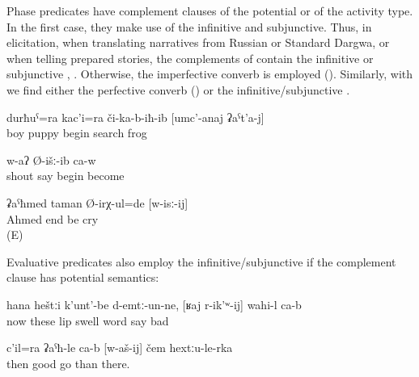 Phase predicates have complement clauses of the potential or of the activity type. In the first case, they make use of the infinitive and subjunctive. Thus, in elicitation, when translating narratives from Russian or Standard Dargwa, or when telling prepared stories, the complements of  contain the infinitive or subjunctive , . Otherwise, the imperfective converb is employed (). Similarly, with  we find either the perfective converb () or the infinitive/subjunctive .
%
\begin{exe}
	\ex	\label{ex:‎The boy and the frog began to search for the frog}
	\gll	durħuˁ=ra	kac'i=ra	či-ka-b-iħ-ib	[umc'-anaj	ʡaˁt'a-j]\\
		boy	puppy	begin	search	frog\\
	\glt	{}

	\ex	\label{ex:He began to shout}
	\gll	[waˁw	Ø-ik'ʷ-ij]	w-aʔ	Ø-išː-ib	ca-w\\
		shout	say	\tsc{m-}begin	become	\\
	\glt	{}

	\ex	\label{ex:Ahmed stopped crying}
	\gll	ʡaˁħmed taman Ø-irχ-ul=de	[w-isː-ij]\\
		Ahmed end	be	cry\\
	\glt	{} (E)
\end{exe}

Evaluative predicates also employ the infinitive\slash subjunctive if the complement clause has potential semantics:
%
\begin{exe}
	\ex	\label{ex:‎Now my lips are swollen, it is difficult to talk}
	\gll	hana	heštːi	k'unt'-be	d-emtː-un-ne,	[ʁaj	r-ik'ʷ-ij]	wahi-l	ca-b	\\
		now	these	lip	swell	word	say	bad	\\
	\glt	{}

	\ex	\label{ex:‎It is good (better) to go (on the ice-covered ground) than from there}
	\gll	c'il=ra	ʡaˁħ-le	ca-b	[w-aš-ij]	čem	hextːu-le-rka	\\
		then	good		go	than	there.\\
	\glt	{}
\end{exe}


